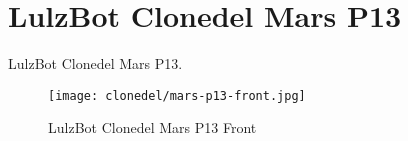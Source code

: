 %
%
%
%
%

\section{LulzBot Clonedel Mars P13}
LulzBot Clonedel Mars P13.

\begin{figure}[h!]
\texttt{[image: clonedel/mars-p13-front.jpg]}
 \caption{LulzBot Clonedel Mars P13 Front}
 \label{fig:clonedel-mars-p13-front}
\end{figure}


